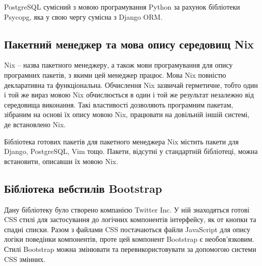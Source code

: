 \documentclass[a4paper, 14pt]{extarticle}
\begin{document}
  PostgreSQL сумісний з мовою програмування Python за рахунок бібліотеки Psycopg,
  яка у свою чергу сумісна з Django ORM.

  \subsection{Пакетний менеджер та мова опису середовищ Nix}
  Nix -- назва пакетного менеджеру, а також мови програмування для опису програмних
  пакетів, з якими цей менеджер працює. Мова Nix повністю декларативна та функціональна.
  Обчислення Nix зазвичай герметичне, тобто один і той же вираз мовою Nix обчислюється в один
  і той же результат незалежно від середовища виконання. Такі властивості дозволяють
  програмним пакетам, зібраним на основі їх опису мовою Nix, працювати на довільній іншій
  системі, де встановлено Nix.

  Бібліотека готових пакетів для пакетного менеджера Nix містить пакети для
  Django, PostgreSQL, Vim тощо. Пакети, відсутні у стандартній бібліотеці, можна
  встановити, описавши їх мовою Nix.

  \subsection{Бібліотека вебстилів Bootstrap}
  Дану бібліотеку було створено компанією Twitter Inc. У ній знаходяться готові
  CSS стилі для застосування до логічних компонентів інтерфейсу, як от
  кнопки та спадні списки. Разом з файлами CSS постачаються файли JavaScript для
  опису логіки поведінки компонентів, проте цей компонент Bootstrap є необов'язковим.
  Стилі Bootstrap можна змінювати та перевикористовувати за допомогою системи CSS змінних.
\end{document}
